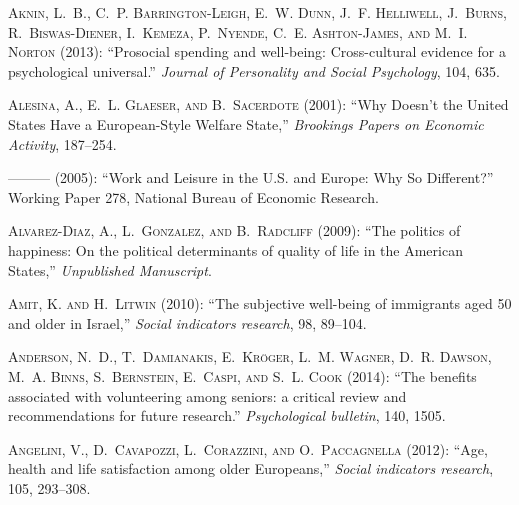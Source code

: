\textsc{Aknin, L.~B., C.~P. Barrington-Leigh, E.~W. Dunn, J.~F. Helliwell,
  J.~Burns, R.~Biswas-Diener, I.~Kemeza, P.~Nyende, C.~E. Ashton-James, and
  M.~I. Norton} (2013): \enquote{Prosocial spending and well-being:
  Cross-cultural evidence for a psychological universal.} \emph{Journal of
  Personality and Social Psychology}, 104, 635.

\textsc{Alesina, A., E.~L. Glaeser, and B.~Sacerdote} (2001): \enquote{Why
  Doesn't the United States Have a European-Style Welfare State,}
  \emph{Brookings Papers on Economic Activity}, 187--254.

---\hspace{-.1pt}---\hspace{-.1pt}--- (2005): \enquote{Work and Leisure in the
  U.S. and Europe: Why So Different?} Working Paper 278, National Bureau of
  Economic Research.

\textsc{Alvarez-Diaz, A., L.~Gonzalez, and B.~Radcliff} (2009): \enquote{{The
  politics of happiness: On the political determinants of quality of life in
  the American States},} \emph{Unpublished Manuscript}.

\textsc{Amit, K. and H.~Litwin} (2010): \enquote{The subjective well-being of
  immigrants aged 50 and older in Israel,} \emph{Social indicators research},
  98, 89--104.

\textsc{Anderson, N.~D., T.~Damianakis, E.~Kr{\"o}ger, L.~M. Wagner, D.~R.
  Dawson, M.~A. Binns, S.~Bernstein, E.~Caspi, and S.~L. Cook} (2014):
  \enquote{The benefits associated with volunteering among seniors: a critical
  review and recommendations for future research.} \emph{Psychological
  bulletin}, 140, 1505.

\textsc{Angelini, V., D.~Cavapozzi, L.~Corazzini, and O.~Paccagnella} (2012):
  \enquote{Age, health and life satisfaction among older Europeans,}
  \emph{Social indicators research}, 105, 293--308.

